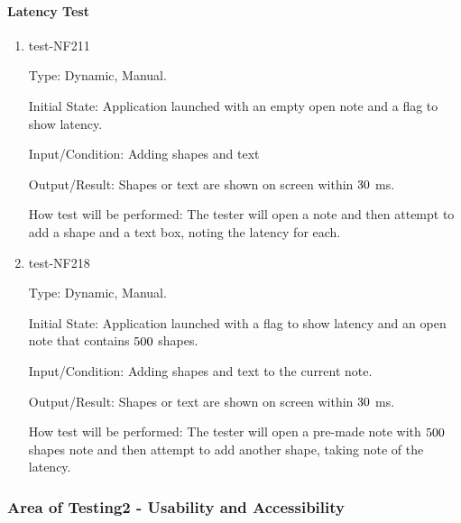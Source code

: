 \documentclass[12pt, titlepage]{article}
\begin{document}
\paragraph{Latency Test}

\begin{enumerate}

\item{test-NF211}

Type: Dynamic, Manual.

Initial State: Application launched with an empty open note and a flag to show latency.

Input/Condition: Adding shapes and text 

Output/Result: Shapes or text are shown on screen within $30$ ms. 

How test will be performed: The tester will open a note and then attempt to add a shape and a text box, noting the latency for each. 

\item{test-NF218}

Type: Dynamic, Manual.

Initial State: Application launched with a flag to show latency and an open note that contains $500$ shapes.

Input/Condition: Adding shapes and text to the current note. 

Output/Result: Shapes or text are shown on screen within $30$ ms. 

How test will be performed: The tester will open a pre-made note with $500$ shapes note and then attempt to add another shape, taking note of the latency. 

\end{enumerate}

\subsubsection{Area of Testing2 - Usability and Accessibility}
\end{document}
